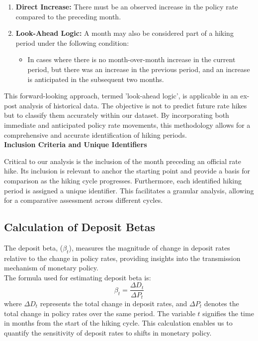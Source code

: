 \documentclass{article}
\begin{document}
\begin{enumerate}
    \item \textbf{Direct Increase:} There must be an observed increase in the policy rate compared to the preceding month.
    
    \item \textbf{Look-Ahead Logic:} A month may also be considered part of a hiking period under the following condition:
    \begin{itemize}
        \item In cases where there is no month-over-month increase in the current period, but there was an increase in the previous period, and an increase is anticipated in the subsequent two months.
    \end{itemize}
\end{enumerate}

This forward-looking approach, termed 'look-ahead logic', is applicable in an ex-post analysis of historical data. The objective is not to predict future rate hikes but to classify them accurately within our dataset. By incorporating both immediate and anticipated policy rate movements, this methodology allows for a comprehensive and accurate identification of hiking periods.\\

\textbf{Inclusion Criteria and Unique Identifiers}

Critical to our analysis is the inclusion of the month preceding an official rate hike. Its inclusion is relevant to anchor the starting point and provide a basis for comparison as the hiking cycle progresses. Furthermore, each identified hiking period is assigned a unique identifier. This facilitates a granular analysis, allowing for a comparative assessment across different cycles.

\subsection{Calculation of Deposit Betas}

The deposit beta, (\( \beta_t \)), measures the magnitude of change in deposit rates relative to the change in policy rates, providing insights into the transmission mechanism of monetary policy.\\

The formula used for estimating deposit beta is:
\[
\beta_t = \frac{\Delta D_t}{\Delta P_t}
\]
where \( \Delta D_t \) represents the total change in deposit rates, and \( \Delta P_t \) denotes the total change in policy rates over the same period. The variable \( t \) signifies the time in months from the start of the hiking cycle. This calculation enables us to quantify the sensitivity of deposit rates to shifts in monetary policy.\\
\end{document}
